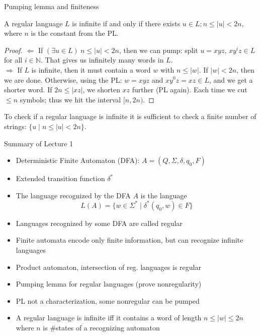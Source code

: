 \documentclass[handout]{beamer}
\begin{document}
\begin{frame}{Pumping lemma and finiteness}
	
	\begin{theorem}
	A regular language $L$ is infinite if and only if there exists $u\in L; n\leq |u|<2n$, where $n$ is the constant from the PL.
	\end{theorem}
	\begin{proof}
        \alert{\Large$\Leftarrow$} If $(\exists u\in L)\ n\leq |u|<2n$, then we can pump: split $u=xyz$, $xy^iz\in L$ for all $i\in \mathbb{N}$. That gives us infinitely many words in $L$.\\	
        \alert{\Large$\Rightarrow$} If $L$ is infinite, then it must contain a word $w$ with $n\leq |w|$. If $|w|<2n$, then we are done. Otherwise, using the PL: $w=xyz$ and $x{y^0}z=xz\in L$, and we get a shorter word. If $2n\leq |xz|$, we shorten  $xz$  further (PL again). Each time we cut $\leq n$ symbols; thus we hit the interval $[n,2n)$.
	\end{proof}
	
	\begin{corollary}To check if a regular language is infinite it is sufficient to check a finite number of strings:  $\{u\mid n\leq |u|<2n\}$.
	\end{corollary}

\end{frame}


\begin{frame}{Summary of Lecture 1}

    \begin{itemize}
        \item  \alert{Deterministic Finite Automaton (DFA)}: $A=(Q,\Sigma,\delta,q_0,F)$
        \item Extended transition function $\delta^*$
        \item The language \alert{recognized} by the DFA $A$ is the language 
        $$
        L(A)=\{w\in \Sigma^* \mid \delta^*(q_0,w)\in F\}
        $$    
        \item Languages recognized by some DFA are called \alert{regular}
        \item Finite automata encode only finite information, but can recognize infinite languages
        \item Product automaton, intersection of reg. languages is regular   
        \item \alert{Pumping lemma for regular languages} (prove nonregularity)
        \item PL not a characterization, some nonregular can be pumped
        \item A regular language is infinite iff it contains a word of length $n\leq |w|\leq 2n$ where $n$ is \#states of a recognizing automaton
    \end{itemize}

\end{frame}
\end{document}
